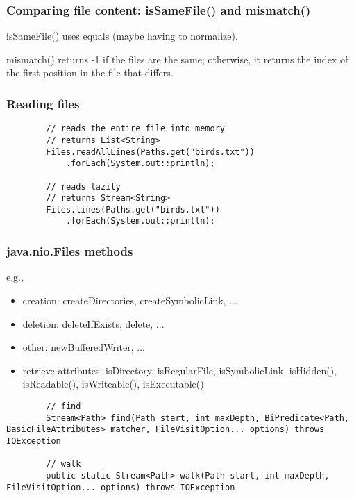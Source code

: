 \documentclass{scrartcl}
\begin{document}
\subsubsection{Comparing file content: isSameFile() and mismatch()}
    isSameFile() uses equals (maybe having to normalize).

    mismatch() returns -1 if the files are the same; otherwise, it returns the index of the first position in the file that differs.

\subsubsection{Reading files}

    \begin{lstlisting}
        // reads the entire file into memory
        // returns List<String>
        Files.readAllLines(Paths.get("birds.txt"))
            .forEach(System.out::println);

        // reads lazily
        // returns Stream<String>
        Files.lines(Paths.get("birds.txt"))
            .forEach(System.out::println);
    \end{lstlisting}

\subsubsection{java.nio.Files methods}

    e.g.,

    \begin{itemize}
        \item creation: createDirectories, createSymbolicLink, ...
        \item deletion: deleteIfExists, delete, ...
        \item other: newBufferedWriter, ...
        \item retrieve attributes: isDirectory, isRegularFile, isSymbolicLink,
            isHidden(), isReadable(), isWriteable(), isExecutable()
    \end{itemize}


    \begin{lstlisting}
        // find
        Stream<Path> find(Path start, int maxDepth, BiPredicate<Path, BasicFileAttributes> matcher, FileVisitOption... options) throws IOException

        // walk
        public static Stream<Path> walk(Path start, int maxDepth, FileVisitOption... options) throws IOException
    \end{lstlisting}
\end{document}
